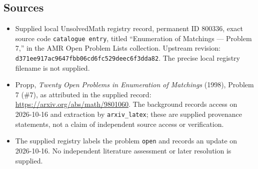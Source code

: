 \documentclass[11pt]{article}
\begin{document}
\subsection{Sources}
\begin{itemize}
\item Supplied local UnsolvedMath registry record, permanent ID \(800336\), exact source code \texttt{catalogue entry}, titled ``Enumeration of Matchings --- Problem 7,'' in the AMR Open Problem Lists collection. Upstream revision: \texttt{d371ee917ac9647fbb06cd6fc529deec6f3dda82}. The precise local registry filename is not supplied.
\item Propp, \emph{Twenty Open Problems in Enumeration of Matchings} (1998), Problem 7 (\#7), as attributed in the supplied record: \url{https://arxiv.org/abs/math/9801060}. The background records access on 2026-10-16 and extraction by \texttt{arxiv\_latex}; these are supplied provenance statements, not a claim of independent source access or verification.
\item The supplied registry labels the problem \texttt{open} and records an update on 2026-10-16. No independent literature assessment or later resolution is supplied.
\end{itemize}
\end{document}

